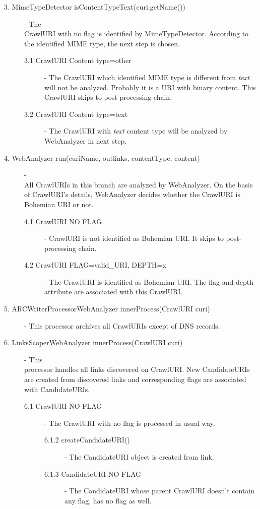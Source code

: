 \documentclass[11pt,a4paper]{article}
\begin{document}
\begin{description}
\item[3. MimeTypeDetector isContentTypeText(curi.getName())] - The \\CrawlURI with no flag is identified by MimeTypeDetector. According to the identified MIME type, the next step is chosen.

\begin{description}
\item[3.1 CrawlURI Content type=other] - The CrawlURI which identified MIME type is different from \emph{text} will not be analyzed. Pro\-bab\-ly it is a URI with binary content. This CrawlURI skips to post-processing chain.
\item[3.2 CrawlURI Content type=text] - The CrawlURI with \emph{text} content type will be analyzed by WebAnalyzer in next step.
\end{description}

\item[4. WebAnalyzer run(curiName, outlinks, contentType, content)] - \\All CrawlURIs in this branch are analyzed by WebAnalyzer. On the basis of CrawlURI's details, WebAnalyzer decides whether the CrawlURI is Bohemian URI or not.

\begin{description}
\item[4.1 CrawlURI NO FLAG] - CrawlURI is not identified as Bohemian URI. It skips to post-processing chain.
\item[4.2 CrawlURI FLAG=valid\_URI, DEPTH=x] - The CrawlURI is identified as Bohemian URI. The flag and depth attribute are associated with this CrawlURI.
\end{description}

\item[5. ARCWriterProcessorWebAnalyzer innerProcess(CrawlURI curi)] - This processor archives all CrawlURIs except of DNS records.
\item[6. LinksScoperWebAnalyzer innerProcess(CrawlURI curi)] - This \\processor handles all links discovered on CrawlURI. New CandidateURIs are created from discovered links and corresponding flags are associated with CandidateURIs.

\begin{description}
\item[6.1 CrawlURI NO FLAG] - The CrawlURI with no flag is processed in usual way.

\begin{description}
\item[6.1.2 createCandidateURI()] - The CandidateURI object is created from link.
\item[6.1.3 CandidateURI NO FLAG] - The CandidateURI whose parent CrawlURI doesn't contain any flag, has no flag as well.
\end{description}


\end{description}
\end{description}
\end{document}
